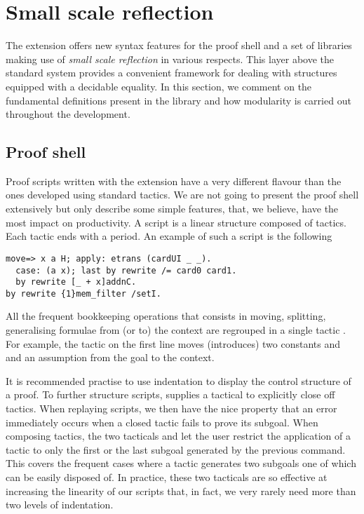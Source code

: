 \section{Small scale reflection}\label{sec:ssr}

The \ssr{} extension \cite{ssr} offers new syntax features for the
proof shell and a set of libraries making use of \emph{small scale
  reflection} in various respects. This layer above the standard
\Coq{} system provides a convenient framework for dealing with
structures equipped with a decidable equality. In this section, 
we comment on  the fundamental definitions present in the library and
how modularity is carried out throughout the development.

\subsection{Proof shell}\label{ssec:shell}

Proof scripts written with the \ssr{} extension have a very different
flavour than the ones developed using standard \Coq{} tactics. We are not 
going to present the proof shell extensively but only describe some 
simple features, that, we believe, have the most impact on productivity.
A script is a linear structure composed of tactics. Each tactic ends with
a period. 
An example of such a script is the following
\begin{lstlisting}
move=> x a H; apply: etrans (cardUI _ _).
  case: (a x); last by rewrite /= card0 card1.
  by rewrite [_ + x]addnC.
by rewrite {1}mem_filter /setI.
\end{lstlisting}
All the frequent bookkeeping operations that consists in moving, splitting, 
generalising formulae from (or to) the context are regrouped in 
a single tactic .
For example, the tactic  on the first line moves (introduces)
two constants  and  and an assumption  from the goal to the
context.

It is recommended practise to use indentation to display the control
structure of a proof. To further structure scripts, \ssr{}
supplies a  tactical to explicitly close off tactics. 
When replaying scripts, we then have the nice property that
an error immediately occurs when a closed tactic fails to prove its subgoal.
When composing tactics, the two tacticals  and
 let the user restrict the application of a tactic to only the
first or the last subgoal generated by the previous command. This
covers the frequent cases where a tactic generates two subgoals one of
which can be easily disposed of.  In practice, these two tacticals are
so effective at increasing the linearity of our scripts that, in fact,
we very rarely need more than two levels of indentation.

